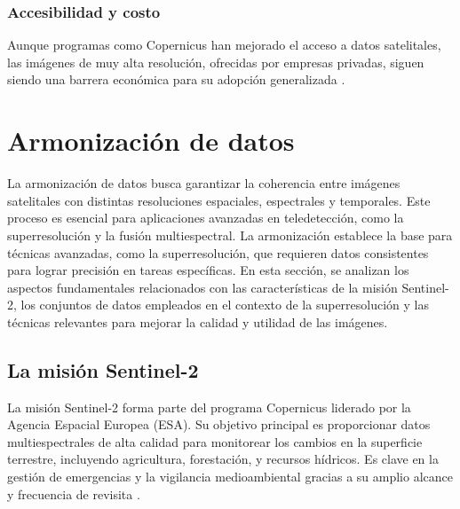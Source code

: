         \subsubsection{Accesibilidad y costo}
            Aunque programas como Copernicus han mejorado el acceso a datos satelitales, las imágenes de muy alta resolución, ofrecidas por empresas privadas, siguen siendo una barrera económica para su adopción generalizada \autocite{denis2016evolution}.

\section{Armonización de datos}

    La armonización de datos busca garantizar la coherencia entre imágenes satelitales con distintas resoluciones espaciales, espectrales y temporales. Este proceso es esencial para aplicaciones avanzadas en teledetección, como la superresolución y la fusión multiespectral. La armonización establece la base para técnicas avanzadas, como la superresolución, que requieren datos consistentes para lograr precisión en tareas específicas. En esta sección, se analizan los aspectos fundamentales relacionados con las características de la misión Sentinel-2, los conjuntos de datos empleados en el contexto de la superresolución y las técnicas relevantes para mejorar la calidad y utilidad de las imágenes.

    \subsection{La misión Sentinel-2}

        La misión Sentinel-2 forma parte del programa Copernicus liderado por la Agencia Espacial Europea (ESA). Su objetivo principal es proporcionar datos multiespectrales de alta calidad para monitorear los cambios en la superficie terrestre, incluyendo agricultura, forestación, y recursos hídricos. Es clave en la gestión de emergencias y la vigilancia medioambiental gracias a su amplio alcance y frecuencia de revisita \autocite{wang2016fusion, lanaras2018super}.


